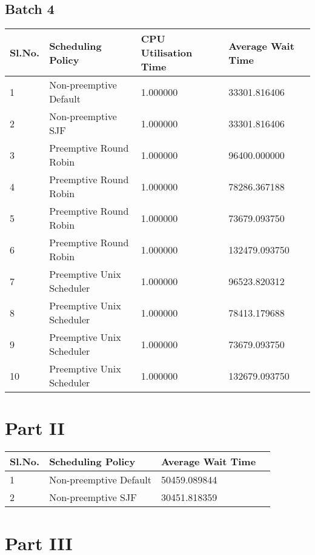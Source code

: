 \documentclass{article}
\begin{document}
\subsection{Batch 4}
\begin{center}
    \begin{tabular}{| l | l | l | l |}
    \hline
    Sl.No. & Scheduling Policy & CPU Utilisation Time & Average Wait Time \\ \hline
    1 & Non-preemptive Default & 1.000000 & 33301.816406 \\
    2 & Non-preemptive SJF & 1.000000 & 33301.816406 \\
    3 & Preemptive Round Robin & 1.000000 & 96400.000000 \\
    4 & Preemptive Round Robin & 1.000000 & 78286.367188 \\
    5 & Preemptive Round Robin & 1.000000 & 73679.093750 \\
    6 & Preemptive Round Robin & 1.000000 & 132479.093750 \\
    7 & Preemptive Unix Scheduler & 1.000000 & 96523.820312 \\
    8 & Preemptive Unix Scheduler & 1.000000 & 78413.179688 \\
    9 & Preemptive Unix Scheduler & 1.000000 & 73679.093750 \\
    10 & Preemptive Unix Scheduler & 1.000000 & 132679.093750 \\
    \hline
    \end{tabular}
\end{center}
\section{Part II}
\begin{center}
    \begin{tabular}{| l | l | l | l |}
    \hline
    Sl.No. & Scheduling Policy & Average Wait Time \\ \hline
    1 & Non-preemptive Default & 50459.089844 \\
    2 & Non-preemptive SJF & 30451.818359 \\
    \hline
    \end{tabular}
\end{center}
\section{Part III}
\end{document}
